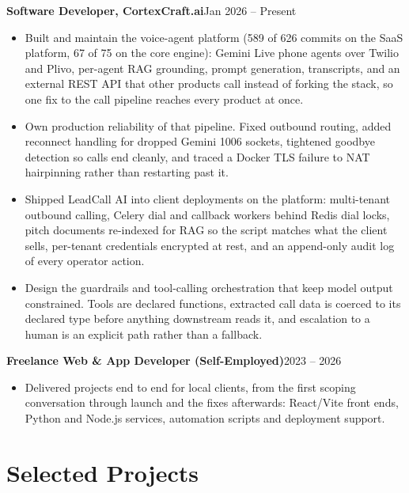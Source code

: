 \documentclass[10pt,a4paper]{article}
\newcommand{\entry}[2]{\textbf{#1}\hfill{#2}\par}
\begin{document}
\entry{Software Developer, CortexCraft.ai}{Jan 2026 -- Present}
\begin{itemize}
  \item Built and maintain the voice-agent platform (589 of 626 commits on the SaaS platform, 67 of 75
        on the core engine): Gemini Live phone agents over Twilio and Plivo, per-agent RAG grounding,
        prompt generation, transcripts, and an external REST API that other products call instead of
        forking the stack, so one fix to the call pipeline reaches every product at once.
  \item Own production reliability of that pipeline. Fixed outbound routing, added reconnect handling
        for dropped Gemini 1006 sockets, tightened goodbye detection so calls end cleanly, and traced
        a Docker TLS failure to NAT hairpinning rather than restarting past it.
  \item Shipped LeadCall AI into client deployments on the platform: multi-tenant outbound calling,
        Celery dial and callback workers behind Redis dial locks, pitch documents re-indexed for RAG so
        the script matches what the client sells, per-tenant credentials encrypted at rest, and an
        append-only audit log of every operator action.
  \item Design the guardrails and tool-calling orchestration that keep model output constrained. Tools
        are declared functions, extracted call data is coerced to its declared type before anything
        downstream reads it, and escalation to a human is an explicit path rather than a fallback.
\end{itemize}

\vspace{1pt}
\entry{Freelance Web \& App Developer (Self-Employed)}{2023 -- 2026}
\begin{itemize}
  \item Delivered projects end to end for local clients, from the first scoping conversation through
        launch and the fixes afterwards: React/Vite front ends, Python and Node.js services,
        automation scripts and deployment support.
\end{itemize}

\section{Selected Projects}
\end{document}
